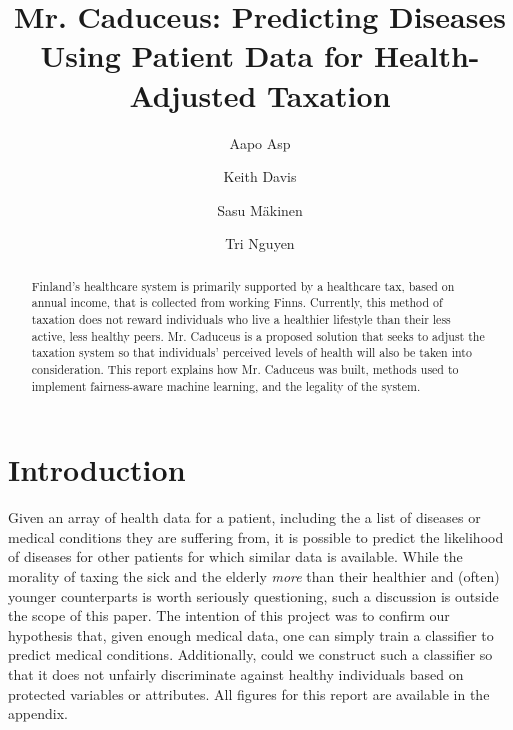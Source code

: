 \documentclass[runningheads]{llncs}
\begin{document}
%
\title{Mr. Caduceus: Predicting Diseases Using Patient Data for Health-Adjusted Taxation }
%
%
\author{Aapo Asp\and
Keith Davis \and
Sasu M{\"a}kinen \and
Tri Nguyen}
%
%

\maketitle             
%
\begin{abstract}
Finland's healthcare system is primarily supported by a healthcare tax, based on annual income, that is collected from working Finns. Currently, this method of taxation does not reward individuals who live a healthier lifestyle than their less active, less healthy peers. Mr. Caduceus is a proposed solution that seeks to adjust the taxation system so that individuals' perceived levels of health will also be taken into consideration. This report explains how Mr. Caduceus was built, methods used to implement fairness-aware machine learning, and the legality of the system.

\end{abstract}
%
%
%
\section{Introduction}
Given an array of health data for a patient, including the a list of diseases or medical conditions they are suffering from, it is possible to predict the likelihood of diseases for other patients for which similar data is available. While the morality of taxing the sick and the elderly \textit{more} than their healthier and (often) younger counterparts is worth seriously questioning, such a discussion is outside the scope of this paper. The intention of this project was to confirm our hypothesis that, given enough medical data, one can simply train a classifier to predict medical conditions. Additionally, could we construct such a classifier so that it does not unfairly discriminate against healthy individuals based on protected variables or attributes. All figures for this report are available in the appendix.
\end{document}
